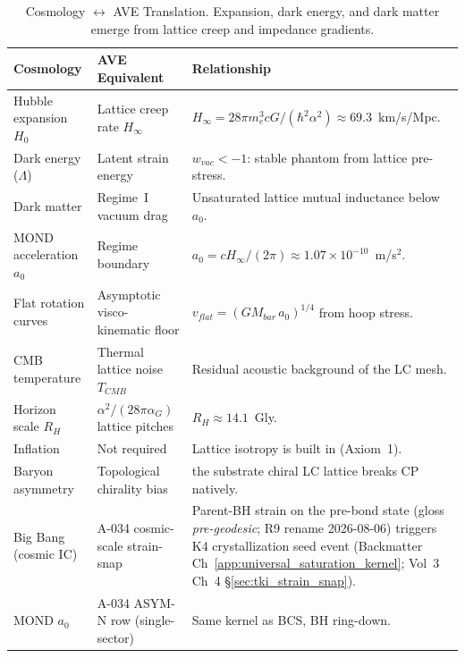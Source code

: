 %

\begin{table}[H]
\centering
\caption{Cosmology $\leftrightarrow$ AVE Translation. Expansion, dark energy, and dark matter emerge from lattice creep and impedance gradients.}
\label{tab:trans_cosmology}
\small
\renewcommand{\arraystretch}{1.3}
\begin{tabularx}{\textwidth}{@{}p{3.8cm} p{4.0cm} X@{}}
\toprule
\textbf{Cosmology} & \textbf{AVE Equivalent} & \textbf{Relationship} \\
\midrule
Hubble expansion $H_0$ & Lattice creep rate $H_\infty$ & $H_\infty = 28\pi m_e^3 cG/(\hbar^2\alpha^2) \approx 69.3$~km/s/Mpc. \\
Dark energy ($\Lambda$) & Latent strain energy & $w_{vac} < -1$: stable phantom from lattice pre-stress. \\
Dark matter & Regime~I vacuum drag & Unsaturated lattice mutual inductance below $a_0$. \\
MOND acceleration $a_0$ & Regime boundary & $a_0 = cH_\infty/(2\pi) \approx 1.07 \times 10^{-10}$~m/s$^2$. \\
Flat rotation curves & Asymptotic visco-kinematic floor & $v_{flat} = (GM_{bar}\,a_0)^{1/4}$ from hoop stress. \\
CMB temperature & Thermal lattice noise $T_{CMB}$ & Residual acoustic background of the LC mesh. \\
Horizon scale $R_H$ & $\alpha^2/(28\pi\alpha_G)$ lattice pitches & $R_H \approx 14.1$~Gly. \\
Inflation & Not required & Lattice isotropy is built in (Axiom~1). \\
Baryon asymmetry & Topological chirality bias & the substrate chiral LC lattice breaks CP natively. \\
Big Bang (cosmic IC) & A-034 cosmic-scale strain-snap & Parent-BH strain on the pre-bond state (gloss \emph{pre-geodesic}; R9 rename 2026-08-06) triggers K4 crystallization seed event (Backmatter Ch~\ref{app:universal_saturation_kernel}; Vol~3 Ch~4 \S\ref{sec:tki_strain_snap}). \\
MOND $a_0$ & A-034 ASYM-N row (single-sector) & Same kernel as BCS, BH ring-down. \\
\bottomrule
\end{tabularx}
\end{table}
